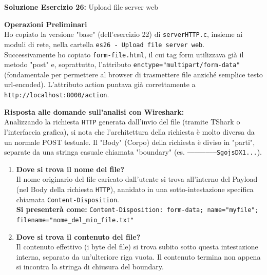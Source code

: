 \documentclass[11pt]{article}
\begin{document}
\begin{tcolorbox}[colback=green!5!white,colframe=green!75!black,title=\textbf{RISPOSTA}, breakable]
\textbf{Soluzione Esercizio 26:} Upload file server web

\textbf{Operazioni Preliminari}\\
Ho copiato la versione "base" (dell'esercizio 22) di \texttt{serverHTTP.c}, insieme ai moduli di rete, nella cartella \texttt{es26 - Upload file server web}.\\
Successivamente ho copiato \texttt{form-file.html}, il cui tag form utilizzava già il metodo "post" e, soprattutto, l'attributo \texttt{enctype="multipart/form-data"} (fondamentale per permettere al browser di trasmettere file anziché semplice testo url-encoded). L'attributo action puntava già correttamente a \texttt{http://localhost:8000/action}.

\textbf{Risposta alle domande sull'analisi con Wireshark:}\\
Analizzando la richiesta \texttt{HTTP} generata dall'invio del file (tramite TShark o l'interfaccia grafica), si nota che l'architettura della richiesta è molto diversa da un normale POST testuale. Il "Body" (Corpo) della richiesta è diviso in "parti", separate da una stringa casuale chiamata "boundary" (es. \texttt{------------------------SgojsDX1...}).

\begin{enumerate}
    \item \textbf{Dove si trova il nome del file?}\\
    Il nome originario del file caricato dall'utente si trova all'interno del Payload (nel Body della richiesta \texttt{HTTP}), annidato in una sotto-intestazione specifica chiamata \texttt{Content-Disposition}.\\
    \textbf{Si presenterà come:} \texttt{Content-Disposition: form-data; name="myfile"; filename="nome\_del\_mio\_file.txt"}
    
    \item \textbf{Dove si trova il contenuto del file?}\\
    Il contenuto effettivo (i byte del file) si trova subito sotto questa intestazione interna, separato da un'ulteriore riga vuota. Il contenuto termina non appena si incontra la stringa di chiusura del boundary.
\end{enumerate}


\end{tcolorbox}
\end{document}
